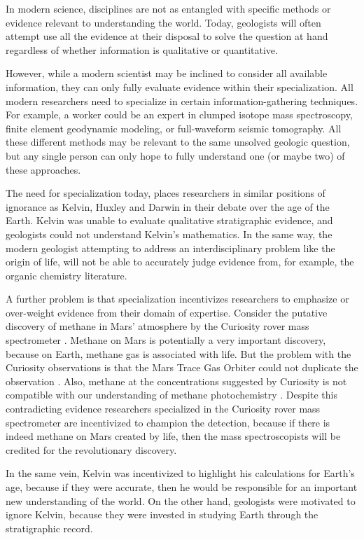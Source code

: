 \documentclass[12pt]{article}
\begin{document}
In modern science, disciplines are not as entangled with specific methods or evidence relevant to understanding the world. Today, geologists will often attempt use all the evidence at their disposal to solve the question at hand regardless of whether information is qualitative or quantitative.

However, while a modern scientist may be inclined to consider all available information, they can only fully evaluate evidence within their specialization. All modern researchers need to specialize in certain information-gathering techniques. For example, a worker could be an expert in clumped isotope mass spectroscopy, finite element geodynamic modeling, or full-waveform seismic tomography. All these different methods may be relevant to the same unsolved geologic question, but any single person can only hope to fully understand one (or maybe two) of these approaches. 

The need for specialization today, places researchers in similar positions of ignorance as Kelvin, Huxley and Darwin in their debate over the age of the Earth. Kelvin was unable to evaluate qualitative stratigraphic evidence, and geologists could not understand Kelvin's mathematics. In the same way, the modern geologist attempting to address an interdisciplinary problem like the origin of life, will not be able to accurately judge evidence from, for example, the organic chemistry literature.

A further problem is that specialization incentivizes researchers to emphasize or over-weight evidence from their domain of expertise. Consider the putative discovery of methane in Mars' atmosphere by the Curiosity rover mass spectrometer \citep{Webster_2015}. Methane on Mars is potentially a very important discovery, because on Earth, methane gas is associated with life. But the problem with the Curiosity observations is that the Mars Trace Gas Orbiter could not duplicate the observation \citep{Korablev_2019}. Also, methane at the concentrations suggested by Curiosity is not compatible with our understanding of methane photochemistry \citep{Lefevre_2009}. Despite this contradicting evidence researchers specialized in the Curiosity rover mass spectrometer are incentivized to champion the detection, because if there is indeed methane on Mars created by life, then the mass spectroscopists will be credited for the revolutionary discovery.

In the same vein, Kelvin was incentivized to highlight his calculations for Earth's age, because if they were accurate, then he would be responsible for an important new understanding of the world. On the other hand, geologists were motivated to ignore Kelvin, because they were invested in studying Earth through the stratigraphic record.
\end{document}
